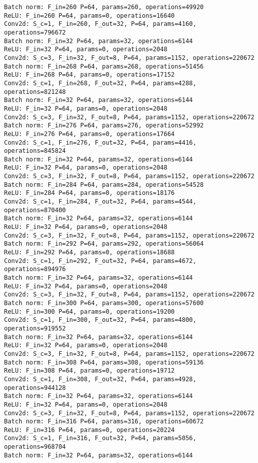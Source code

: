 \begin{Verbatim}[fontsize=\small]
Batch norm: F_in=260 P=64, params=260, operations=49920
ReLU: F_in=260 P=64, params=0, operations=16640
Conv2d: S_c=1, F_in=260, F_out=32, P=64, params=4160, operations=796672
Batch norm: F_in=32 P=64, params=32, operations=6144
ReLU: F_in=32 P=64, params=0, operations=2048
Conv2d: S_c=3, F_in=32, F_out=8, P=64, params=1152, operations=220672
Batch norm: F_in=268 P=64, params=268, operations=51456
ReLU: F_in=268 P=64, params=0, operations=17152
Conv2d: S_c=1, F_in=268, F_out=32, P=64, params=4288, operations=821248
Batch norm: F_in=32 P=64, params=32, operations=6144
ReLU: F_in=32 P=64, params=0, operations=2048
Conv2d: S_c=3, F_in=32, F_out=8, P=64, params=1152, operations=220672
Batch norm: F_in=276 P=64, params=276, operations=52992
ReLU: F_in=276 P=64, params=0, operations=17664
Conv2d: S_c=1, F_in=276, F_out=32, P=64, params=4416, operations=845824
Batch norm: F_in=32 P=64, params=32, operations=6144
ReLU: F_in=32 P=64, params=0, operations=2048
Conv2d: S_c=3, F_in=32, F_out=8, P=64, params=1152, operations=220672
Batch norm: F_in=284 P=64, params=284, operations=54528
ReLU: F_in=284 P=64, params=0, operations=18176
Conv2d: S_c=1, F_in=284, F_out=32, P=64, params=4544, operations=870400
Batch norm: F_in=32 P=64, params=32, operations=6144
ReLU: F_in=32 P=64, params=0, operations=2048
Conv2d: S_c=3, F_in=32, F_out=8, P=64, params=1152, operations=220672
Batch norm: F_in=292 P=64, params=292, operations=56064
ReLU: F_in=292 P=64, params=0, operations=18688
Conv2d: S_c=1, F_in=292, F_out=32, P=64, params=4672, operations=894976
Batch norm: F_in=32 P=64, params=32, operations=6144
ReLU: F_in=32 P=64, params=0, operations=2048
Conv2d: S_c=3, F_in=32, F_out=8, P=64, params=1152, operations=220672
Batch norm: F_in=300 P=64, params=300, operations=57600
ReLU: F_in=300 P=64, params=0, operations=19200
Conv2d: S_c=1, F_in=300, F_out=32, P=64, params=4800, operations=919552
Batch norm: F_in=32 P=64, params=32, operations=6144
ReLU: F_in=32 P=64, params=0, operations=2048
Conv2d: S_c=3, F_in=32, F_out=8, P=64, params=1152, operations=220672
Batch norm: F_in=308 P=64, params=308, operations=59136
ReLU: F_in=308 P=64, params=0, operations=19712
Conv2d: S_c=1, F_in=308, F_out=32, P=64, params=4928, operations=944128
Batch norm: F_in=32 P=64, params=32, operations=6144
ReLU: F_in=32 P=64, params=0, operations=2048
Conv2d: S_c=3, F_in=32, F_out=8, P=64, params=1152, operations=220672
Batch norm: F_in=316 P=64, params=316, operations=60672
ReLU: F_in=316 P=64, params=0, operations=20224
Conv2d: S_c=1, F_in=316, F_out=32, P=64, params=5056, operations=968704
Batch norm: F_in=32 P=64, params=32, operations=6144

\end{Verbatim}

